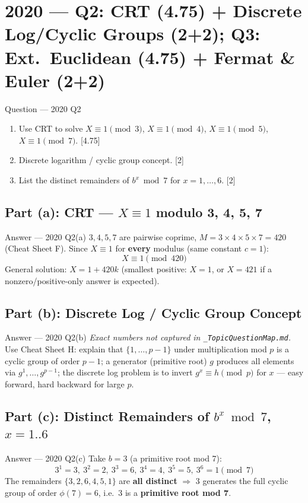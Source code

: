 \documentclass[12pt,a4paper]{article}
\begin{document}
\newpage
\section{2020 --- Q2: CRT (4.75) + Discrete Log/Cyclic Groups (2+2); Q3: Ext.\ Euclidean (4.75) + Fermat \& Euler (2+2)}

\begin{qbox}{Question --- 2020 Q2}
\begin{enumerate}[label=(\alph*)]
  \item Use CRT to solve $X\equiv1\pmod{3}$, $X\equiv1\pmod{4}$, $X\equiv1\pmod{5}$, $X\equiv1\pmod{7}$. \hfill [4.75]
  \item Discrete logarithm / cyclic group concept. \hfill [2]
  \item List the distinct remainders of $b^x \bmod 7$ for $x=1,\dots,6$. \hfill [2]
\end{enumerate}
\end{qbox}

\subsection{Part (a): CRT --- $X\equiv1$ modulo 3, 4, 5, 7}
\begin{solbox}{Answer --- 2020 Q2(a)}
$3,4,5,7$ are pairwise coprime, $M=3\times4\times5\times7=420$ (Cheat Sheet F).
Since $X\equiv1$ for \textbf{every} modulus (same constant $c=1$):
\[
X \equiv \boxed{1} \pmod{420}
\]
General solution: $X=1+420k$ (smallest positive: $X=1$, or $X=421$ if a nonzero/positive-only answer is expected).
\end{solbox}

\subsection{Part (b): Discrete Log / Cyclic Group Concept}
\begin{solbox}{Answer --- 2020 Q2(b)}
\textit{Exact numbers not captured in \texttt{\_TopicQuestionMap.md}.} Use Cheat Sheet H: explain that $\{1,\dots,p-1\}$ under multiplication mod $p$ is a cyclic group of order $p-1$; a generator (primitive root) $g$ produces all elements via $g^1,\dots,g^{p-1}$; the discrete log problem is to invert $g^x\equiv h\pmod p$ for $x$ --- easy forward, hard backward for large $p$.
\end{solbox}

\subsection{Part (c): Distinct Remainders of $b^x \bmod 7$, $x=1..6$}
\begin{solbox}{Answer --- 2020 Q2(c)}
Take $b=3$ (a primitive root mod 7):
\[
3^1=3,\ 3^2=2,\ 3^3=6,\ 3^4=4,\ 3^5=5,\ 3^6=1 \pmod 7
\]
The remainders $\{3,2,6,4,5,1\}$ are \textbf{all distinct} $\Rightarrow$ 3 generates the full cyclic group of order $\phi(7)=6$, i.e.\ 3 is a \textbf{primitive root mod 7}.
\end{solbox}
\end{document}
